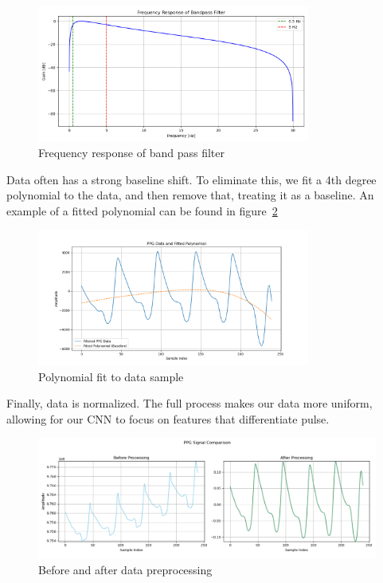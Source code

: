 \documentclass{article}
\begin{document}
\begin{figure}[H]
    \centering
    \includegraphics[width=0.8\textwidth]{../media/bpf.png}
    \caption{Frequency response of band pass filter}
    \label{fig:bpf}
\end{figure}

Data often has a strong baseline shift. To eliminate this, we fit a 4th degree polynomial to the data, and then remove that, treating it as a baseline. An example of a fitted polynomial can be found in figure~\ref{fig:poly}

\begin{figure}[H]
    \centering
    \includegraphics[width=0.8\textwidth]{../media/poly.png}
    \caption{Polynomial fit to data sample}
    \label{fig:poly}
\end{figure}

Finally, data is normalized. The full process makes our data more uniform, allowing for our CNN to focus on features that differentiate pulse.

\begin{figure}[H]
    \centering
    \includegraphics[width=1.0\textwidth]{../media/bef_n_aft.png}
    \caption{Before and after data preprocessing}
    \label{fig:bef_n_aft}
\end{figure}
\end{document}
